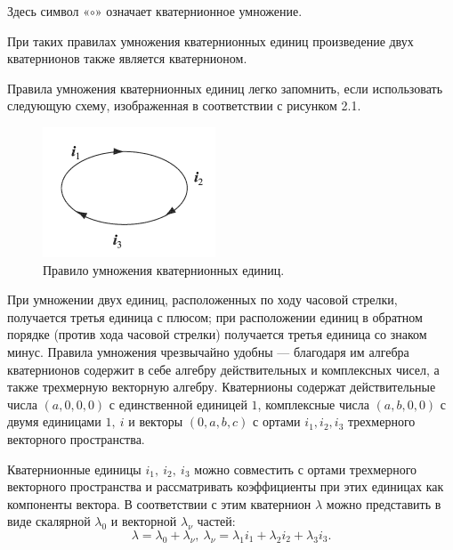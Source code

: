 \documentclass[14pt]{extreport}
\begin{document}
Здесь символ «$\circ$» означает кватернионное умножение.

При таких правилах умножения кватернионных единиц произведение двух кватернионов также является кватернионом.

Правила умножения кватернионных единиц легко запомнить, если использовать следующую схему, изображенная в соответствии с рисунком 2.1.
\begin{figure}[h]
\center \includegraphics[scale=1]{fig/img21.png}
\caption{Правило умножения кватернионных единиц.}
\end{figure}

При умножении двух единиц, расположенных по ходу часовой стрелки, получается третья единица с плюсом; при расположении единиц в обратном порядке (против хода часовой стрелки) получается третья единица со знаком минус. Правила умножения чрезвычайно удобны — благодаря им алгебра кватернионов содержит в себе алгебру действительных и комплексных чисел, а также трехмерную векторную алгебру. Кватернионы содержат действительные числа $(a,0,0,0)$ с единственной единицей $1$, комплексные числа $(a,b,0,0)$ с двумя единицами $1,\ i$ и векторы $(0, a, b, c)$ с ортами $i_{1},i_{2},i_{3}$ трехмерного векторного пространства.

Кватернионные единицы $i_{1},\ i_{2},\ i_{3}$ можно совместить с ортами трехмерного векторного пространства и рассматривать коэффициенты при этих единицах как компоненты вектора. В соответствии с этим кватернион $\lambda$ можно представить в виде скалярной $\lambda_{0}$ и векторной $\lambda_{\nu}$ частей:
\begin{equation}
\label{quat-sum-scal-vect}
\lambda=\lambda_{0}+\lambda_{\nu},\ \lambda_{\nu}=\lambda_{1}i_{1}+\lambda_{2}i_{2}+\lambda_{3}i_{3}.
\end{equation}
\end{document}

